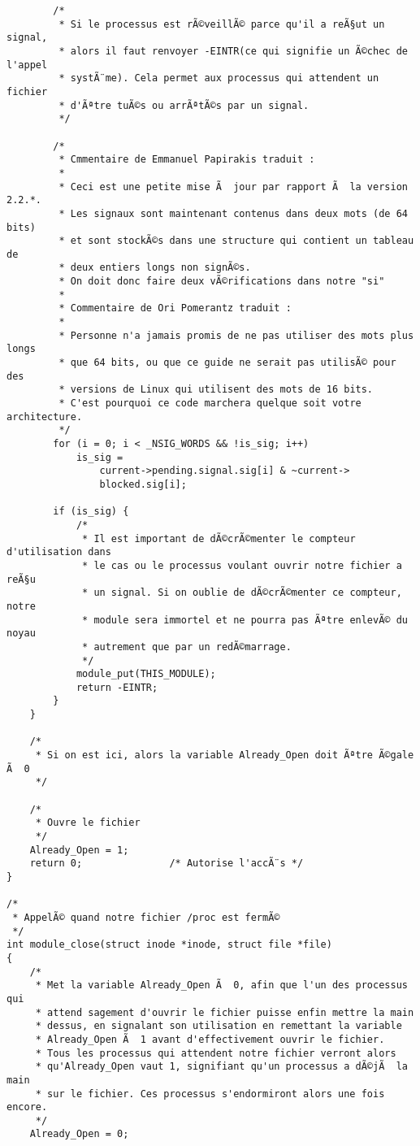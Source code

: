 \documentclass[11pt]{article}
\begin{document}
\begin{verbatim}
        /*
         * Si le processus est rÃ©veillÃ© parce qu'il a reÃ§ut un signal,
         * alors il faut renvoyer -EINTR(ce qui signifie un Ã©chec de l'appel
         * systÃ¨me). Cela permet aux processus qui attendent un fichier
         * d'Ãªtre tuÃ©s ou arrÃªtÃ©s par un signal.
         */

        /*
         * Cmmentaire de Emmanuel Papirakis traduit :
         *
         * Ceci est une petite mise Ã  jour par rapport Ã  la version 2.2.*.
         * Les signaux sont maintenant contenus dans deux mots (de 64 bits)
         * et sont stockÃ©s dans une structure qui contient un tableau de
         * deux entiers longs non signÃ©s.
         * On doit donc faire deux vÃ©rifications dans notre "si"
         *
         * Commentaire de Ori Pomerantz traduit :
         *
         * Personne n'a jamais promis de ne pas utiliser des mots plus longs
         * que 64 bits, ou que ce guide ne serait pas utilisÃ© pour des
         * versions de Linux qui utilisent des mots de 16 bits.
         * C'est pourquoi ce code marchera quelque soit votre architecture.
         */
        for (i = 0; i < _NSIG_WORDS && !is_sig; i++)
            is_sig =
                current->pending.signal.sig[i] & ~current->
                blocked.sig[i];

        if (is_sig) {
            /*
             * Il est important de dÃ©crÃ©menter le compteur d'utilisation dans
             * le cas ou le processus voulant ouvrir notre fichier a reÃ§u
             * un signal. Si on oublie de dÃ©crÃ©menter ce compteur, notre
             * module sera immortel et ne pourra pas Ãªtre enlevÃ© du noyau
             * autrement que par un redÃ©marrage.
             */
            module_put(THIS_MODULE);
            return -EINTR;
        }
    }

    /*
     * Si on est ici, alors la variable Already_Open doit Ãªtre Ã©gale Ã  0
     */

    /*
     * Ouvre le fichier
     */
    Already_Open = 1;
    return 0;               /* Autorise l'accÃ¨s */
}

/*
 * AppelÃ© quand notre fichier /proc est fermÃ©
 */
int module_close(struct inode *inode, struct file *file)
{
    /*
     * Met la variable Already_Open Ã  0, afin que l'un des processus qui
     * attend sagement d'ouvrir le fichier puisse enfin mettre la main
     * dessus, en signalant son utilisation en remettant la variable
     * Already_Open Ã  1 avant d'effectivement ouvrir le fichier.
     * Tous les processus qui attendent notre fichier verront alors
     * qu'Already_Open vaut 1, signifiant qu'un processus a dÃ©jÃ  la main
     * sur le fichier. Ces processus s'endormiront alors une fois encore.
     */
    Already_Open = 0;


\end{verbatim}
\end{document}
